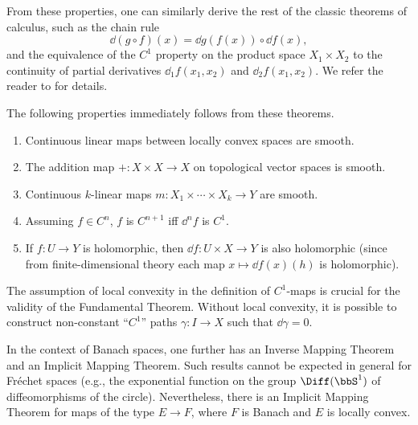 From these properties, one can similarly derive the rest of the classic theorems of calculus, such as the chain rule
\[\dd(g\circ f)(x)=\dd g(f(x))\circ \dd f(x),\]
and the equivalence of the $C^1$ property on the product space $X_1\times X_2$ to the continuity of partial derivatives $\dd_1f(x_1,x_2)$ and $\dd_2 f(x_1,x_2)$. We refer the reader to \cite[Sec.~II]{Neeb} for details.

\begin{rem}
The following properties immediately follows from these theorems.
\begin{enumerate}[label=(\alph*)]
    \item Continuous linear maps between locally convex spaces are smooth.
    \item The addition map $+:X\times X\to X$ on topological vector spaces is smooth.
    \item Continuous $k$-linear maps $m:X_1\times\cdots\times X_k\to Y$ are smooth.
    \item Assuming $f\in C^n$, $f$ is $C^{n+1}$ iff $\dd^n f$ is $C^1$.
    \item If $f:U\to Y$ is holomorphic, then $\dd f:U\times X\to Y$ is also holomorphic (since from finite-dimensional theory each map $x\mapsto \dd f(x)(h)$ is holomorphic).
\end{enumerate}
\end{rem}


\begin{rem}
    The assumption of local convexity in the definition of $C^1$-maps is crucial for the validity of the Fundamental Theorem. Without local convexity, it is possible to construct non-constant ``$C^1$'' paths $\gamma:I\to X$ such that $\dd \gamma=0$.

    In the context of Banach spaces, one further has an Inverse Mapping Theorem and an Implicit Mapping Theorem. Such results cannot be expected in general for Fr\'echet spaces (e.g., the exponential function on the group $\Diff(\bbS^1)$ of diffeomorphisms of the circle). Nevertheless, there is an Implicit Mapping Theorem for maps of the type $E\to F$, where $F$ is Banach and $E$ is locally convex.
\end{rem}

